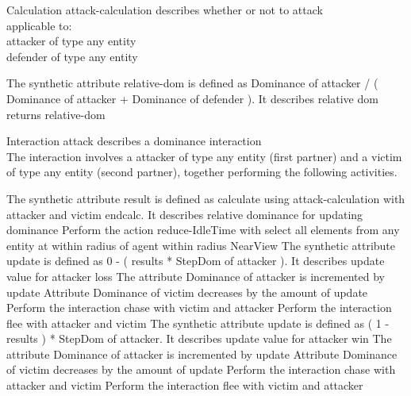 \documentclass{article}
\begin{document}
\parbox{\linewidth}{
Calculation {\color{purple}attack-calculation} describes whether or not to attack\\
applicable to:\\
{\color{orange}attacker} of type any entity\\
{\color{orange}defender} of type any entity\\
\begin{algorithm}[H]
    The synthetic attribute {\color{blue}relative-dom} is defined as {\color{blue}Dominance} of  {\color{orange}attacker} / ( {\color{blue}Dominance} of  {\color{orange}attacker} + {\color{blue}Dominance} of  {\color{orange}defender} ). It describes relative dom\;
    returns {\color{blue}relative-dom}
\end{algorithm}
\hline
}

\parbox{\linewidth}{
Interaction {\color{purple}attack} describes a dominance interaction\\
The interaction involves a attacker of type any entity (first partner) and a victim of type any entity (second partner), together performing the following activities.\\
\begin{algorithm}[H]
    The synthetic attribute {\color{blue}result} is defined as calculate using attack-calculation with attacker and victim endcalc. It describes relative dominance for updating dominance\;
    Perform the action {\color{purple}reduce-IdleTime} with select all elements from any entity at within radius of agent  within radius  NearView
    {
    The synthetic attribute {\color{blue}update} is defined as 0 - ( results * StepDom of  attacker ). It describes update value for attacker loss 
    The attribute {\color{blue}Dominance} of  attacker is incremented by update 
    Attribute {\color{blue}Dominance} of  victim decreases by the amount of update 
    Perform the interaction chase with victim and attacker 
    Perform the interaction flee with attacker and victim 
    }
    {
    The synthetic attribute {\color{blue}update} is defined as ( 1 - results ) * StepDom of  attacker. It describes update value for attacker win 
    The attribute {\color{blue}Dominance} of  attacker is incremented by {\color{blue}update} 
    Attribute {\color{blue}Dominance} of  victim decreases by the amount of {\color{blue}update}
    Perform the {\color{purple}interaction} chase with attacker and victim 
    Perform the {\color{purple}interaction} flee with victim and attacker 
    }
\end{algorithm}
\hline
}
\end{document}
